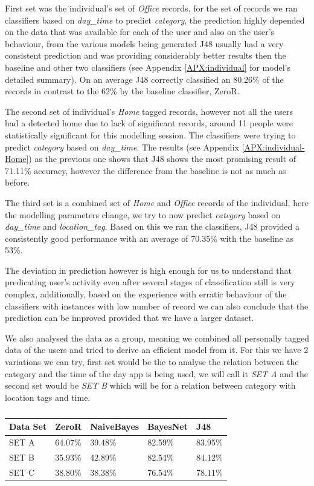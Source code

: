 \documentclass[prodmode,acmtecs]{acmsmall}
\begin{document}
First set was the individual's set of \textit{Office} records, for the set of records we ran classifiers based on \textit{day\_time} to predict \textit{category}, the prediction highly depended on the data that was available for each of the user and also on the user's behaviour, from the various models being generated J48 usually had a very consistent prediction and was providing considerably better results then the baseline and other two classifiers (see Appendix \ref{APX:individual} for model's detailed summary). On an average J48 correctly classified an 80.26\% of the records in contrast to the 62\% by the baseline classifier, ZeroR. 

The second set of individual's \textit{Home} tagged records, however not all the users had a detected home due to lack of significant records, around 11 people were statistically significant for this modelling session. The classifiers were trying to predict \textit{category} based on \textit{day\_time}. The results (see Appendix \ref{APX:individual-Home}) as the previous one shows that J48 shows the most promising result of 71.11\% accuracy, however the difference from the baseline is not as much as before.

The third set is a combined set of \textit{Home} and \textit{Office} records of the individual, here the modelling parameters change, we try to now predict \textit{category} based on \textit{day\_time} and \textit{location\_tag}. Based on this we ran the classifiers, J48 provided  a consistently good performance with an average of 70.35\% with the baseline as 53\%.

The deviation in prediction however is high enough for us to understand that predicating user's activity even after several stages of classification still is very complex, additionally, based on the experience with erratic behaviour of the classifiers with instances with low number of record we can also conclude that the prediction can be improved provided that we have a larger dataset.

We also analysed the data as a group, meaning we combined all personally tagged data of the users and tried to derive an efficient model from it. For this we have 2 variations we can try, first set would be the to analyse the relation between the category and the time of the day app is being used, we will call it \textit{SET A} and the second set would be \textit{SET B} which will be for a relation between category with location tags and time.

\begin{table}[htdp]
\begin{tabularx}{\textwidth}{|X|X|X|X|X|}
\hline
\textbf{Data Set}      &\textbf{ZeroR}      & \textbf{NaiveBayes}      & \textbf{BayesNet}     & \textbf{J48}      \\ \hline
SET A & 64.07\% & 39.48\% & 82.59\% & 83.95\% \\
SET B & 35.93\% & 42.89\% & 82.54\% & 84.12\% \\
SET C & 38.80\%	& 38.38\% &	76.54\%	& 78.11\% \\ \hline
\end{tabularx}
\caption{}
\label{TBL:generalprediction}
\end{table}
\end{document}
